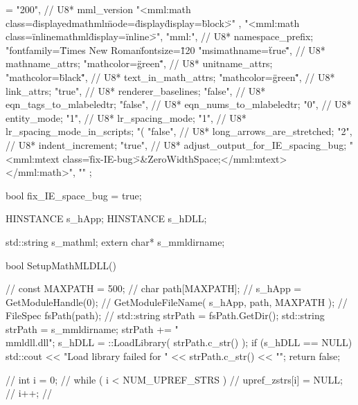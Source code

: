 {{{{{{{{{{\fwbeginmacro
{}\fwplusequals \fwodef \fwbtx[const int NUM_UPREF_STRS = 20;
const int FIX_IE_BUG = 18;

char *upref_zstrs[] = {
  "200",                           // U8* mml_version
  "<mml:math class=\"displayedmathml\" mode=\"display\" display=\"block\">" ,
  "<mml:math class=\"inlinemathml\" display=\"inline\">",
  "mml:",                         //  U8* namespace_prefix;
  "fontfamily=\"Times New Roman\" fontsize=\"120%
  "msimathname=\"true\"",         //  U8* mathname_attrs;
  "mathcolor=\"green\"",          //  U8* unitname_attrs;
  "mathcolor=\"black\"",          //  U8* text_in_math_attrs;
  "mathcolor=\"green\"",          //  U8* link_attrs;
  "true",                         //  U8* renderer_baselines;
  "false",                        //  U8* eqn_tags_to_mlabeledtr;
  "false",                        //  U8* eqn_nums_to_mlabeledtr;
  "0",                            //  U8* entity_mode;
  "1",                            //  U8* lr_spacing_mode;
  "1",                            //  U8* lr_spacing_mode_in_scripts;
  "(%
  "false",                        //  U8* long_arrows_are_stretched;
  "2",                            //  U8* indent_increment;
  "true",                         //  U8* adjust_output_for_IE_spacing_bug;
  "<mml:mtext class=\"fix-IE-bug\">&ZeroWidthSpace;</mml:mtext></mml:math>",
  ""
};



bool fix_IE_space_bug =  true;

HINSTANCE s_hApp;
HINSTANCE s_hDLL;

std::string s_mathml;
extern char* s_mmldirname;

bool SetupMathMLDLL()
{
    // const MAXPATH = 500;
    // char path[MAXPATH];
    // s_hApp = GetModuleHandle(0);
    // GetModuleFileName( s_hApp, path, MAXPATH );
    // FileSpec fsPath(path);
    // std::string strPath = fsPath.GetDir();
    std::string strPath = s_mmldirname;
    strPath += "\\mmldll.dll";
    s_hDLL = ::LoadLibrary( strPath.c_str() );
    if (s_hDLL == NULL) {
      std::cout << "Load library failed for " << strPath.c_str() << "\n";
      return false;
    }

    // int i = 0;
    // while ( i < NUM_UPREF_STRS ) {
    //   upref_zstrs[i]  =  NULL;
    //   i++;
    // }

}}}}}}}}}}}
